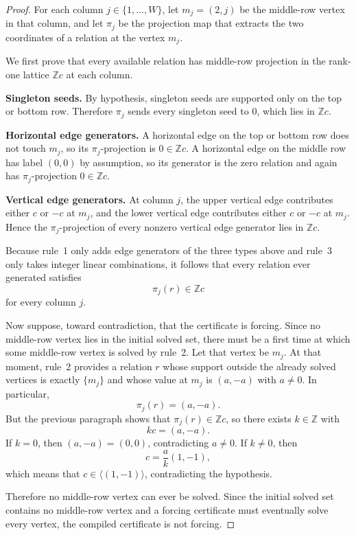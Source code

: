 \documentclass[11pt]{article}
\theoremstyle{definition}
\newcommand{\Z}{\mathbb{Z}}
\begin{document}
\begin{proof}
For each column $j\in\{1,\dots,W\}$, let $m_j=(2,j)$ be the middle-row vertex in that column, and let $\pi_j$ be the projection map that extracts the two coordinates of a relation at the vertex $m_j$.

We first prove that every available relation has middle-row projection in the rank-one lattice $\Z c$ at each column.

\textbf{Singleton seeds.}
By hypothesis, singleton seeds are supported only on the top or bottom row. Therefore $\pi_j$ sends every singleton seed to $0$, which lies in $\Z c$.

\textbf{Horizontal edge generators.}
A horizontal edge on the top or bottom row does not touch $m_j$, so its $\pi_j$-projection is $0\in \Z c$. A horizontal edge on the middle row has label $(0,0)$ by assumption, so its generator is the zero relation and again has $\pi_j$-projection $0\in \Z c$.

\textbf{Vertical edge generators.}
At column $j$, the upper vertical edge contributes either $c$ or $-c$ at $m_j$, and the lower vertical edge contributes either $c$ or $-c$ at $m_j$. Hence the $\pi_j$-projection of every nonzero vertical edge generator lies in $\Z c$.

Because rule~1 only adds edge generators of the three types above and rule~3 only takes integer linear combinations, it follows that every relation ever generated satisfies
\[
\pi_j(r)\in \Z c
\]
for every column $j$.

Now suppose, toward contradiction, that the certificate is forcing. Since no middle-row vertex lies in the initial solved set, there must be a first time at which some middle-row vertex is solved by rule~2. Let that vertex be $m_j$. At that moment, rule~2 provides a relation $r$ whose support outside the already solved vertices is exactly $\{m_j\}$ and whose value at $m_j$ is $(a,-a)$ with $a\neq 0$. In particular,
\[
\pi_j(r)=(a,-a).
\]
But the previous paragraph shows that $\pi_j(r)\in \Z c$, so there exists $k\in \Z$ with
\[
k c=(a,-a).
\]
If $k=0$, then $(a,-a)=(0,0)$, contradicting $a\neq 0$. If $k\neq 0$, then
\[
c=\frac{a}{k}(1,-1),
\]
which means that $c\in \langle(1,-1)\rangle$, contradicting the hypothesis.

Therefore no middle-row vertex can ever be solved. Since the initial solved set contains no middle-row vertex and a forcing certificate must eventually solve every vertex, the compiled certificate is not forcing.
\end{proof}
\end{document}
